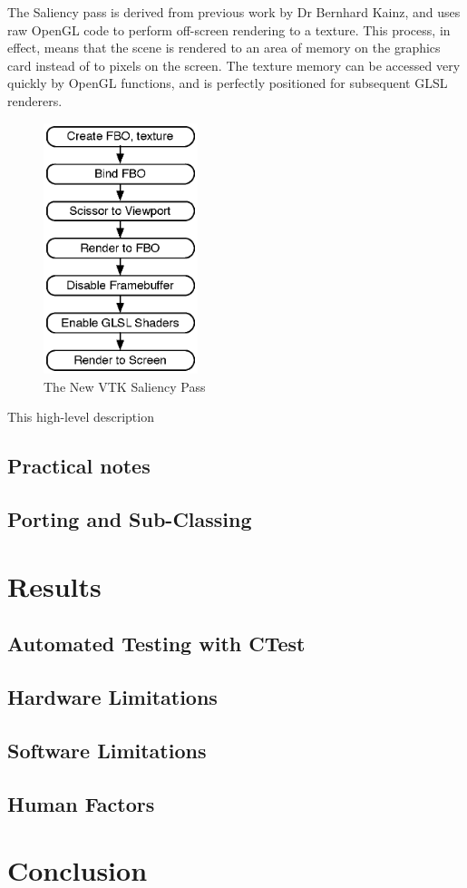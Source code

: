 \documentclass[MSc,paper=a4,pagesize=auto]{icldt}
\begin{document}
The Saliency pass is derived from previous work by Dr Bernhard Kainz, and uses raw OpenGL code to perform off-screen rendering to a texture. This process, in effect, means that the scene is rendered to an area of memory on the graphics card instead of to pixels on the screen. The texture memory can be accessed very quickly by OpenGL functions, and is perfectly positioned for subsequent GLSL renderers.

\begin{figure}[htbp!]
    \centering
    \includegraphics[width=0.4\textwidth]{resources/vtk_saliency}
    \caption{The New VTK Saliency Pass}
    \label{fig:vtk_saliency}
\end{figure}

This high-level description 

\section{Practical notes}
\section{Porting and Sub-Classing}

\chapter{Results}
\section{Automated Testing with CTest}
\section{Hardware Limitations}
\section{Software Limitations}
\section{Human Factors}


\chapter{Conclusion}
\nocite{Margulies2013}

	
\end{document}
